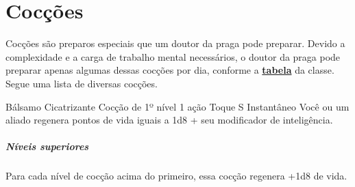 \documentclass[letterpaper,twocolumn,openany]{dndbook}
\begin{document}
	\section{Cocções}
	Cocções são preparos especiais que um doutor da praga pode preparar. Devido a complexidade e a carga de trabalho mental necessários, o doutor da praga pode preparar apenas algumas dessas cocções por dia, conforme a \hyperref[tab:doutor_da_praga]{\textbf{tabela}} da classe.
	Segue uma lista de diversas cocções.
	
	\spellheader%
	{Bálsamo Cicatrizante}
	{Cocção de 1º nível}
	{1 ação}
	{Toque}
	{S}
	{Instantâneo}
	Você ou um aliado regenera pontos de vida iguais a 1d8 + seu modificador de inteligência.
	\subparagraph{Níveis superiores} Para cada nível de cocção acima do primeiro, essa cocção regenera +1d8 de vida.
	
\end{document}
